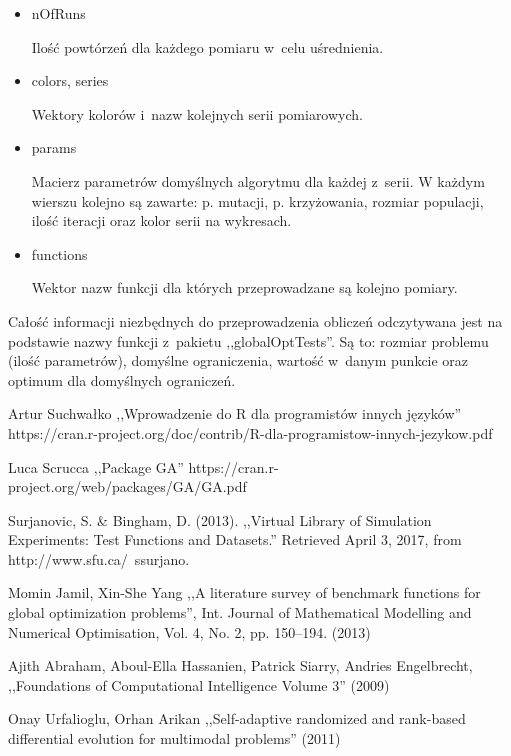 \documentclass[11pt, a4paper]{article}
\begin{document}
\begin{itemize}
	\item nOfRuns
	
	Ilość powtórzeń dla każdego pomiaru w~celu uśrednienia.
	
	\item colors, series
	
	Wektory kolorów i~nazw kolejnych serii pomiarowych. 
	
	\item params
	
	Macierz parametrów domyślnych algorytmu dla każdej z~serii. W każdym wierszu kolejno są zawarte: p. mutacji, p. krzyżowania, rozmiar populacji, ilość iteracji oraz kolor serii na wykresach.
	
	\item functions
	
	Wektor nazw funkcji dla których przeprowadzane są kolejno pomiary.
	
\end{itemize}

Całość informacji niezbędnych do przeprowadzenia obliczeń odczytywana jest na podstawie nazwy funkcji z~pakietu ,,globalOptTests''. Są to: rozmiar problemu (ilość parametrów), domyślne ograniczenia, wartość w~danym punkcie oraz optimum dla domyślnych ograniczeń.

\newpage
\begin{thebibliography}{40}

Artur Suchwałko ,,Wprowadzenie do R dla programistów innych języków'' https://cran.r-project.org/doc/contrib/R-dla-programistow-innych-jezykow.pdf


Luca Scrucca ,,Package GA''
https://cran.r-project.org/web/packages/GA/GA.pdf

Surjanovic, S. \& Bingham, D. (2013). ,,Virtual Library of Simulation Experiments: Test Functions and Datasets.'' Retrieved April 3, 2017, from http://www.sfu.ca/~ssurjano.

Momin Jamil, Xin-She Yang ,,A literature survey of benchmark functions for global optimization problems'', Int. Journal of Mathematical Modelling and Numerical Optimisation, Vol. 4, No. 2, pp. 150–194. (2013)

Ajith Abraham, Aboul-Ella Hassanien, Patrick Siarry, Andries Engelbrecht, ,,Foundations of Computational Intelligence Volume 3'' (2009)

Onay Urfalioglu, Orhan Arikan ,,Self-adaptive randomized and rank-based differential evolution for multimodal problems'' (2011)

\end{thebibliography}
\end{document}
